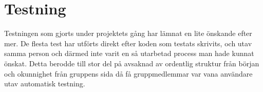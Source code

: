 %
%
%
%
%

\section{Testning}
Testningen som gjorts under projektets gång har lämnat en lite önskande efter mer. De flesta test har utförts direkt efter koden som testats skrivits, och utav samma person och därmed inte varit en så utarbetad process man hade kunnat önskat. Detta berodde till stor del på avsaknad av ordentlig struktur från början och okunnighet från gruppens sida då få gruppmedlemmar var vana användare utav automatisk testning.

